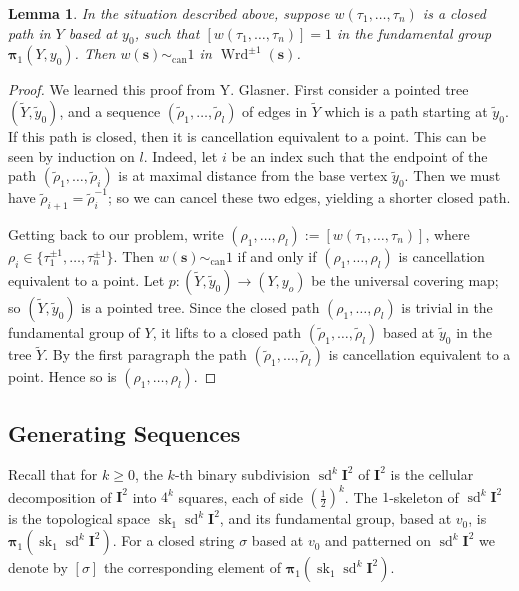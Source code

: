 \documentclass[10pt, a4paper]{amsart}
\newtheorem{lem}[equation]{Lemma}
\theoremstyle{definition}
\numberwithin{equation}{section}
\newcommand{\opn}{\operatorname}
\newcommand{\mbf}[1]{\mathbf{#1}}
\newcommand{\mrm}[1]{\mathrm{#1}}
\newcommand{\smfrac}[2]{{\textstyle \frac{#1}{#2}}}
\newcommand{\bsym}[1]{\boldsymbol{#1}}
\newcommand{\til}[1]{\tilde{#1}}
\begin{document}
\begin{lem} \label{lem:15}
In the situation described above, suppose $w(\tau_1, \ldots, \tau_n)$ is a
closed path in $Y$ based at $y_0$, such that 
$[w(\tau_1, \ldots, \tau_n)] = 1$ in the fundamental group
$\bsym{\pi}_1(Y, y_0)$. Then $w(\bsym{s}) \sim_{\mrm{can}} 1$ 
in $\opn{Wrd}^{\pm 1}(\bsym{s})$. 
\end{lem}

\begin{proof}
We learned this proof from Y. Glasner.
First consider a pointed tree $(\til{Y}, \til{y}_0)$, and a sequence 
$(\til{\rho}_1, \ldots, \til{\rho}_l)$ of edges in $\til{Y}$ which is a path
starting at $\til{y}_0$.
If this path is closed, then it is cancellation equivalent to
a point. This can be seen by induction on $l$. 
Indeed, let $i$ be an index such that the endpoint of the path
$(\til{\rho}_1, \ldots, \til{\rho}_i)$ is at maximal distance from the
base vertex $\til{y}_0$. Then we must have
$\til{\rho}_{i+1} = \til{\rho}_i^{-1}$; so we can cancel these two edges,
yielding a shorter closed path. 

Getting back to our problem, write
$(\rho_1, \ldots, \rho_l) := [w(\tau_1, \ldots, \tau_n)]$, where 
$\rho_i \in \{ \tau_1^{\pm 1}, \ldots, \tau_n^{\pm 1} \}$.
Then $w(\bsym{s}) \sim_{\mrm{can}} 1$ if and only if 
$(\rho_1, \ldots, \rho_l)$ is cancellation equivalent to a point. 
Let $p : (\til{Y}, \til{y}_0) \to (Y, y_o)$ be the universal covering map; so 
$(\til{Y}, \til{y}_0)$ is a pointed tree.
Since the closed path 
$(\rho_1, \ldots, \rho_l)$ is trivial in the fundamental group of $Y$, it lifts
to a closed path $(\til{\rho}_1, \ldots, \til{\rho}_l)$
based at $\til{y}_0$ in the tree $\til{Y}$. By the first paragraph the 
path $(\til{\rho}_1, \ldots, \til{\rho}_l)$ is cancellation equivalent to a
point. Hence so is $(\rho_1, \ldots, \rho_l)$.
\end{proof}


\subsection{Generating Sequences}
Recall that for $k \geq 0$, the $k$-th binary subdivision 
$\opn{sd}^k \mbf{I}^2$ of $\mbf{I}^2$ is the cellular decomposition of 
$\mbf{I}^2$ into $4^k$ squares, each of side $(\smfrac{1}{2})^k$. 
The $1$-skeleton of $\opn{sd}^k \mbf{I}^2$ is the topological space
$\opn{sk}_1 \opn{sd}^k \mbf{I}^2$, and its fundamental group, based at $v_0$, is
$\bsym{\pi}_1(\opn{sk}_1 \opn{sd}^k \mbf{I}^2)$.
For a closed string $\sigma$ based at $v_0$ and patterned on 
$\opn{sd}^k \mbf{I}^2$ we denote by 
$[\sigma]$ the corresponding element of 
$\bsym{\pi}_1(\opn{sk}_1 \opn{sd}^k \mbf{I}^2)$.
\end{document}
